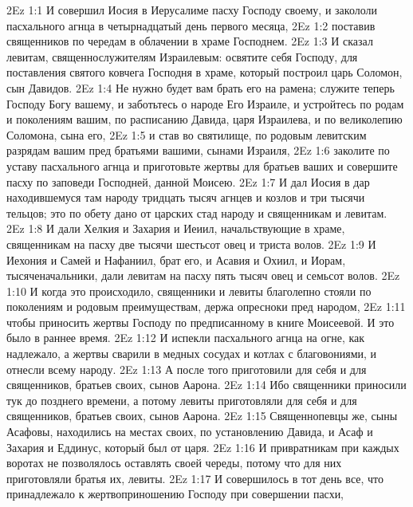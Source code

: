 \vs 2Ez 1:1 И совершил Иосия в Иерусалиме пасху Господу своему, и закололи пасхального агнца в четырнадцатый день первого месяца,
\vs 2Ez 1:2 поставив священников по чередам в облачении в храме Господнем.
\vs 2Ez 1:3 И сказал левитам, священнослужителям Израилевым: освятите себя Господу, для поставления святого ковчега Господня в храме, который построил царь Соломон, сын Давидов.
\vs 2Ez 1:4 Не нужно будет вам брать его на рамена; служите теперь Господу Богу вашему, и заботьтесь о народе Его Израиле, и устройтесь по родам и поколениям вашим, по расписанию Давида, царя Израилева, и по великолепию Соломона, сына его,
\vs 2Ez 1:5 и став во святилище, по родовым левитским разрядам вашим пред братьями вашими, сынами Израиля,
\vs 2Ez 1:6 заколите по уставу пасхального агнца и приготовьте жертвы для братьев ваших и совершите пасху по заповеди Господней, данной Моисею.
\rsbpar\vs 2Ez 1:7 И дал Иосия в дар находившемуся там народу тридцать тысяч агнцев и козлов и три тысячи тельцов; это по обету дано от царских стад народу и священникам и левитам.
\vs 2Ez 1:8 И дали Хелкия и Захария и Иеиил, начальствующие в храме, священникам на пасху две тысячи шестьсот овец и триста волов.
\vs 2Ez 1:9 И Иехония и Самей и Нафаниил, брат его, и Асавия и Охиил, и Иорам, тысяченачальники, дали левитам на пасху пять тысяч овец и семьсот волов.
\rsbpar\vs 2Ez 1:10 И когда это происходило, священники и левиты благолепно стояли по поколениям и родовым преимуществам, держа опресноки пред народом,
\vs 2Ez 1:11 чтобы приносить жертвы Господу по предписанному в книге Моисеевой. И это было в раннее время.
\vs 2Ez 1:12 И испекли пасхального агнца на огне, как надлежало, а жертвы сварили в медных сосудах и котлах с благовониями, и отнесли всему народу.
\vs 2Ez 1:13 А после того приготовили для себя и для священников, братьев своих, сынов Аарона.
\vs 2Ez 1:14 Ибо священники приносили тук до позднего времени, а потому левиты приготовляли для себя и для священников, братьев своих, сынов Аарона.
\vs 2Ez 1:15 Священнопевцы же, сыны Асафовы, находились на местах своих, по установлению Давида, и Асаф и Захария и Еддинус, который был от царя.
\vs 2Ez 1:16 И привратникам при каждых воротах не позволялось оставлять своей череды, потому что для них приготовляли братья их, левиты.
\rsbpar\vs 2Ez 1:17 И совершилось в тот день все, что принадлежало к жертвоприношению Господу при совершении пасхи,
